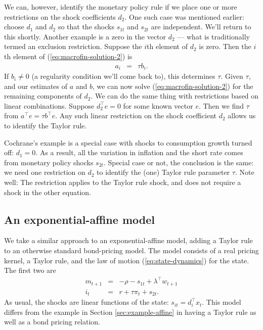 \documentclass[12pt]{article}
\begin{document}
{We can, however, identify the monetary policy rule
if we place one or more restrictions on the shock coefficients $d_2$.
One such case was mentioned earlier:
choose $d_1$ and $d_2$ so that the shocks $s_{1t}$ and $s_{2t}$ are independent.
We'll return to this shortly.
Another example is a zero in the vector $d_2$ ---
what is traditionally termed an exclusion restriction.
Suppose the $i$th element of $d_2$ is zero.
Then the $i$th element of (\ref{eq:macrofin-solution-2}) is
\begin{eqnarray*}
    a_i &=& \tau b_i .
\end{eqnarray*}
If $b_i \neq 0$ (a regularity condition we'll come back to),
this determines $\tau$.
Given $\tau$, and our estimates of $a$ and $b$,
we can now solve (\ref{eq:macrofin-solution-2}) for
the remaining components of $d_2$.
We can do the same thing with restrictions based on linear combinations.
Suppose $d_2^\top e = 0$ for some known vector $e$.
Then we find $\tau$ from $a^\top e = \tau b^\top e$.
Any such linear restriction on the shock coefficient $d_2$ allows
us to identify the Taylor rule.

Cochrane's example is a special case with shocks to
consumption growth turned off:  $d_1 = 0$.
As a result, all the variation in inflation and the short rate
comes from monetary policy shocks $s_{2t}$.
Special case or not, the conclusion is the same:
we need one restriction on $d_2$ to identify the (one) Taylor rule parameter $\tau$.
Note well:  The restriction applies to the Taylor rule shock,
and does not require a shock in the other equation.


\subsection{An exponential-affine model}

We take a similar approach to an exponential-affine model,
adding a Taylor rule to an otherwise standard bond-pricing model.
The model consists of a real pricing kernel,
a Taylor rule, and the law of motion (\ref{eq:state-dynamics}) for the state.
The first two are
\begin{eqnarray*}
    m_{t+1} &=& -\rho - s_{1t} + \lambda^\top w_{t+1} \\
    i_t &=& r + \tau \pi_t + s_{2t} .
\end{eqnarray*}
As usual, the shocks are linear functions of the state:  $s_{it} = d_i^\top x_t$.
This model differs from the example in Section \ref{sec:example-affine}
in having a Taylor rule as well as a bond pricing relation.

}
\end{document}
